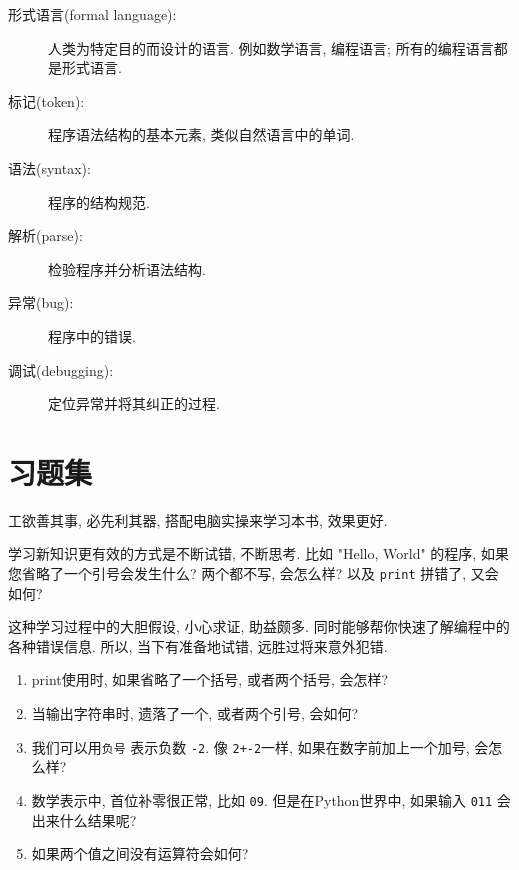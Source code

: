\documentclass[10pt]{book}
\begin{document}
\begin{description}
\item[形式语言(formal language):] 人类为特定目的而设计的语言. 
例如数学语言, 编程语言; 所有的编程语言都是形式语言. 

\item[标记(token):] 程序语法结构的基本元素, 类似自然语言中的单词. 

\item[语法(syntax):] 程序的结构规范. 

\item[解析(parse):] 检验程序并分析语法结构. 

\item[异常(bug):] 程序中的错误. 

\item[调试(debugging):] 定位异常并将其纠正的过程. 

\end{description}


\section{习题集}

\begin{exercise}

工欲善其事, 必先利其器, 搭配电脑实操来学习本书, 效果更好. 

学习新知识更有效的方式是不断试错, 不断思考. 比如 "Hello, World" 的程序, 
如果您省略了一个引号会发生什么?
两个都不写, 会怎么样?
以及 {\tt print} 拼错了, 又会如何?

这种学习过程中的大胆假设, 小心求证, 助益颇多. 
同时能够帮你快速了解编程中的各种错误信息. 
所以, 当下有准备地试错, 远胜过将来意外犯错. 

\begin{enumerate}

\item print使用时, 如果省略了一个括号, 或者两个括号, 会怎样?

\item 当输出字符串时, 遗落了一个, 或者两个引号, 会如何? 

\item 我们可以用{\tt 负号} 表示负数 {\tt -2}. 
像 {\tt 2+-2}一样, 如果在数字前加上一个加号, 会怎么样? 


\item 数学表示中, 首位补零很正常, 比如 {\tt09}. 
但是在Python世界中, 如果输入 {\tt 011} 会出来什么结果呢?

\item 如果两个值之间没有运算符会如何? 

\end{enumerate}

\end{exercise}
\end{document}
